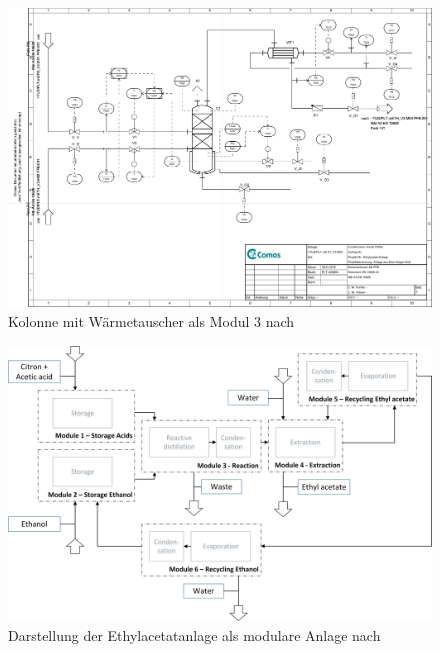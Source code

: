 \begin{figure}[h!tb]
\centering
\includegraphics[height=\textwidth,angle=90]{bilder/M03_Kolonne_mit_Waermetauscher.pdf}
\caption[PID Modul 3]{Kolonne mit W\"armetauscher als Modul 3 nach \cite{Pfeffer_2016}}
\label{fig:PIDMod3}
\end{figure}

\begin{figure}[h!tb]
\centering
\includegraphics[width=0.9\textheight,angle=90]{bilder/mETH_V3_eng.png}
\caption[Modulare Gesamtanlage]{Darstellung der Ethylacetatanlage als modulare Anlage nach \cite{Pfeffer_2016}}
\label{fig:PIDGes}
\end{figure}

